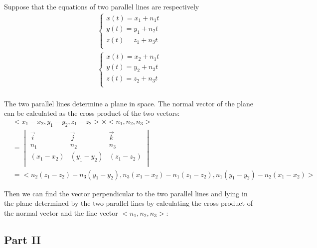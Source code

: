 \documentclass{article}
\begin{document}
Suppose that the equations of two parallel lines are respectively
\begin{gather*}
  \begin{cases}
    x(t) = x_1 + n_1t \\
    y(t) = y_1 + n_2t \\
    z(t) = z_1 + n_3t \\
  \end{cases} \\
  \begin{cases}
    x(t) = x_2 + n_1t \\
    y(t) = y_2 + n_2t \\
    z(t) = z_2 + n_3t \\
  \end{cases} \\
\end{gather*}

The two parallel lines determine a plane in space. The normal vector of the 
plane can be calculated as the cross product of the two vectors:
\begin{equation*}
  \begin{split}
    &<x_1 - x_2, y_1 - y_2, z_1 - z_2> \times <n_1, n_2, n_3> \\
    &= \begin{vmatrix}
         \vec{i} & \vec{j} & \vec{k} \\
         n_1 & n_2 & n_3 \\
         (x_1 - x_2) & (y_1 - y_2) & (z_1 - z_2) \\
       \end{vmatrix} \\
    &= <n_2(z_1 - z_2) - n_3(y_1 - y_2), n_3(x_1 - x_2) - n_1(z_1 - z_2), n_1(y_1 - y_2) - n_2(x_1 - x_2)>
  \end{split}
\end{equation*}

Then we can find the vector perpendicular to the two parallel lines and lying in 
the plane determined by the two parallel lines by calculating the cross product 
of the normal vector and the line vector $<n_1, n_2, n_3>$:


\begin{center}
\section*{Part II}
\end{center}

\bigskip
\end{document}

